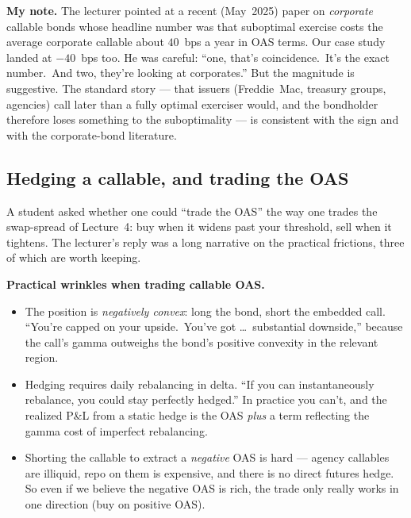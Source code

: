 \begin{checkpoint}
\textbf{My note.} The lecturer pointed at a recent (May~2025) paper on
\emph{corporate} callable bonds whose headline number was that
suboptimal exercise costs the average corporate callable about
$40$~bps a year in OAS terms. Our case study landed at $-40$~bps too.
He was careful: ``one, that's coincidence.\ It's the exact number.\
And two, they're looking at corporates.'' But the magnitude is
suggestive. The standard story --- that issuers (Freddie~Mac, treasury
groups, agencies) call later than a fully optimal exerciser would,
and the bondholder therefore loses something to the suboptimality ---
is consistent with the sign and with the corporate-bond literature.
\end{checkpoint}

\subsection{Hedging a callable, and trading the OAS}\label{L6-sec:freddie-hedge}

A student asked whether one could ``trade the OAS'' the way one
trades the swap-spread of Lecture~4: buy when it widens past your
threshold, sell when it tightens. The lecturer's reply was a long
narrative on the practical frictions, three of which are worth
keeping.

\begin{keyblock}
\textbf{Practical wrinkles when trading callable OAS.}
\begin{itemize}
  \item The position is \emph{negatively convex}: long the bond, short
        the embedded call. ``You're capped on your upside.\ You've got
        \ldots\ substantial downside,'' because the call's gamma
        outweighs the bond's positive convexity in the relevant
        region.
  \item Hedging requires daily rebalancing in delta. ``If you can
        instantaneously rebalance, you could stay perfectly hedged.''
        In practice you can't, and the realized P\&L from a static
        hedge is the OAS \emph{plus} a term reflecting the gamma cost
        of imperfect rebalancing.
  \item Shorting the callable to extract a \emph{negative} OAS is
        hard --- agency callables are illiquid, repo on them is
        expensive, and there is no direct futures hedge. So even if
        we believe the negative OAS is rich, the trade only really
        works in one direction (buy on positive OAS).
\end{itemize}
\end{keyblock}

